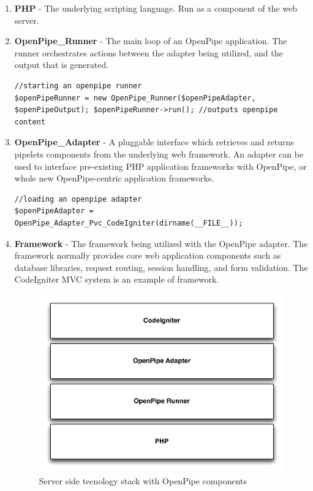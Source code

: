 \documentclass[12pt]{report}
\begin{document}
\begin{enumerate}
	\item \textbf{PHP} - The underlying scripting language. Run as a component of the web server.
	\item \textbf{OpenPipe\_Runner} - The main loop of an OpenPipe application. The runner orchestrates actions between the adapter being utilized, and the output that is generated.
		\begin{lstlisting}
//starting an openpipe runner
$openPipeRunner = new OpenPipe_Runner($openPipeAdapter, $openPipeOutput); $openPipeRunner->run(); //outputs openpipe content
		\end{lstlisting}

	\item \textbf{OpenPipe\_Adapter} - A pluggable interface which retrieves and returns pipelets components from the underlying web framework. An adapter can be used to interface pre-existing PHP application frameworks with OpenPipe, or whole new OpenPipe-centric application frameworks.
		\begin{lstlisting}
//loading an openpipe adapter
$openPipeAdapter = OpenPipe_Adapter_Pvc_CodeIgniter(dirname(__FILE__));
		\end{lstlisting}	

	\item \textbf{Framework} - The framework being utilized with the OpenPipe adapter. The framework normally provides core web application components such as database libraries, request routing, session handling, and form validation. The CodeIgniter MVC system is an example of framework.
	
		\begin{figure}[H]
		\label{fig:frameworkStack}
		\centering
		\includegraphics[width=\textwidth,keepaspectratio]{figures/images/framework_stack.pdf}
		\caption{Server side tecnology stack with OpenPipe components}
		\end{figure}

\end{enumerate}
\end{document}
